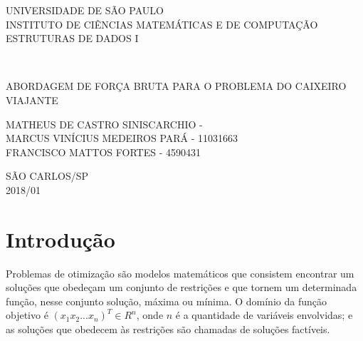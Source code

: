 \documentclass[a4paper, 12pt]{article} %
\date{2018}
\begin{document}
	\begin{titlepage}
\flushleft
	
		\begin{minipage}{1\linewidth}
	\centering
	
			UNIVERSIDADE DE SÃO PAULO\\
			INSTITUTO DE CIÊNCIAS  MATEMÁTICAS E DE COMPUTAÇÃO\\
			ESTRUTURAS DE DADOS I\\
			\end{minipage}
			\\[6.7 cm]
			\begin{center}
			ABORDAGEM DE FORÇA BRUTA PARA O PROBLEMA DO CAIXEIRO VIAJANTE\\[5 cm]
			\end{center}
			\begin{flushleft}
				
				MATHEUS DE CASTRO SINISCARCHIO - \\
				MARCUS VINÍCIUS MEDEIROS PARÁ - 11031663\\
				FRANCISCO MATTOS FORTES - 4590431\\ \vspace{\fill}
			\end{flushleft}
		\begin{center}
			SÃO CARLOS/SP\\2018/01
		\end{center}
		

	\end{titlepage}
	\renewcommand{\contentsname}{\normalsize{SUMÁRIO}}
	\tableofcontents
	
	\newpage
	
	\section{Introdução}
	
	
	Problemas de otimização são modelos matemáticos que consistem encontrar um soluções que obedeçam um conjunto de restrições e que tornem um determinada função, nesse conjunto solução, máxima ou mínima. O domínio da função objetivo é $( x_1 x_2 ... x_n)^T \in R^n$, onde $n$ é a quantidade de variáveis envolvidas; e as soluções que obedecem às restrições são chamadas de soluções factíveis.
	
\end{document}
